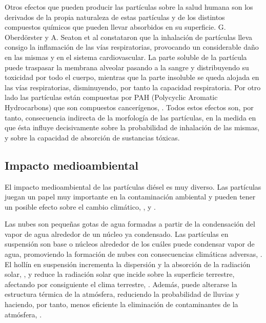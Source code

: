 \par Otros efectos que pueden producir las partículas sobre la salud humana son los derivados de la propia naturaleza de estas partículas y de los distintos compuestos químicos que pueden llevar absorbidos en su superficie. G. Oberdörster \cite{oberdoster:2001} y A. Seaton et al \cite{seatonetal:1995} constataron que la inhalación de partículas lleva consigo la inflamación de las vías respiratorias, provocando un considerable daño en las mismas y en el sistema cardiovascular. La parte soluble de la partícula puede traspasar la membrana alveolar pasando a la sangre y distribuyendo su toxicidad por todo el cuerpo, mientras que la parte insoluble se queda alojada en las vías respiratorias, disminuyendo, por tanto la capacidad respiratoria. Por otro lado las partículas están compuestas por PAH (Polycyclic Aromatic Hydrocarbons) que son compuestos cancerígenos, \cite{benneretal:1990}. Todos estos efectos son, por tanto, consecuencia indirecta de la morfología de las partículas, en la medida en que ésta influye decisivamente sobre la probabilidad de inhalación de las mismas, y sobre la capacidad de absorción de sustancias tóxicas.

\subsection{Impacto medioambiental} \label{subsec:ImpactoMedioambiental}

\par El impacto medioambiental de las partículas diésel es muy diverso. Las partículas juegan un papel muy importante en la contaminación ambiental y pueden tener un posible efecto sobre el cambio climático, \cite{przybiolla:2002}, \cite{petterssonetal:2004} y \cite{chameidesetal:2002}.

\par Las nubes son pequeñas gotas de agua formadas a partir de la condensación del vapor de agua alrededor de un núcleo ya condensado. Las partículas en suspensión son base o núcleos alrededor de los cuáles puede condensar vapor de agua, promoviendo la formación de nubes con consecuencias climáticas adversas, \cite{zhangetal:2006}. El hollín en suspensión incrementa la dispersión y la absorción de la radiación solar, \cite{ackermanetal:2000}, y reduce la radiación solar que incide sobre la superficie terrestre, afectando por consiguiente el clima terrestre, \cite{menonetal:2002}. Además, puede alterarse la estructura térmica de la atmósfera, reduciendo la probabilidad de lluvias y haciendo, por tanto, menos eficiente la eliminación de contaminantes de la atmósfera, \cite{ramanathanetal:2001}.

